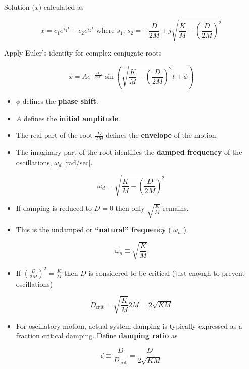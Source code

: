 \documentclass[
]{book}
\providecommand{\tightlist}{%
  \setlength{\itemsep}{0pt}\setlength{\parskip}{0pt}}
\begin{document}
Solution (\(x\)) calculated as

\[
x = c_1 e^{\tau_1 t} + c_2 e^{\tau_2 t} \text{ where } s_1\text{, } s_2 = -\frac{D}{2M} \pm j \sqrt{ \frac{K}{M} - \left( \frac{D}{2M} \right)^2 }  
\]

Apply Euler's identity for complex conjugate roots

\[
x = A e^{-\frac{D}{2M} t} \sin \left( \sqrt{\frac{K}{M} - \left(\frac{D}{2M} \right)^2} t + \phi  \right)
\]

\begin{itemize}
\tightlist
\item
  \(\phi\) defines the \textbf{phase shift}.
\item
  \(A\) defines the \textbf{initial amplitude}.
\item
  The real part of the root \(\frac{D}{2M}\) defines the \textbf{envelope} of the motion.
\item
  The imaginary part of the root identifies the \textbf{damped frequency} of the oscillations, \(\omega_d\) {[}rad/sec{]}.
\end{itemize}

\[
\omega_d = \sqrt{\frac{K}{M} - \left(\frac{D}{2M} \right)^2}
\]

\begin{itemize}
\tightlist
\item
  If damping is reduced to \(D= 0\) then only \(\sqrt{\frac{K}{M}}\) remains.
\item
  This is the undamped or \textbf{``natural'' frequency} ( \(\omega_n\) ).
\end{itemize}

\[
\omega_n \equiv \sqrt{\frac{K}{M}}
\]

\begin{itemize}
\tightlist
\item
  If \(\left( \frac{D}{2M} \right)^2 = \frac{K}{M}\) then \(D\) is considered to be critical (just enough to prevent oscillations)
\end{itemize}

\[
D_{\mathrm{crit}} = \sqrt{\frac{K}{M}} 2M = 2 \sqrt{KM}
\]

\begin{itemize}
\tightlist
\item
  For oscillatory motion, actual system damping is typically expressed as a fraction critical damping. Define \textbf{damping ratio} as
\end{itemize}

\[
\zeta \equiv \frac{D}{ D_{ \mathrm{crit} } } = \frac{D}{ 2 \sqrt{KM} }
\]
\end{document}
